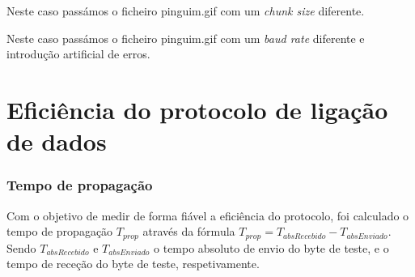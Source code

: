 \documentclass[11pt]{report}
\begin{document}
Neste caso passámos o ficheiro pinguim.gif com um \textit{chunk size} diferente.

Neste caso passámos o ficheiro pinguim.gif com um \textit{baud rate} diferente e
introdução artificial de erros.

{\let\clearpage\relax \chapter{Eficiência do protocolo de ligação de dados}}

\subsection{Tempo de propagação}

Com o objetivo de medir de forma fiável a eficiência do protocolo, foi calculado
o tempo de propagação $T_{prop}$ através da fórmula
$T_{prop} = T_{absRecebido} - T_{absEnviado}$. Sendo $T_{absRecebido}$ e $T_{absEnviado}$ o tempo
absoluto de envio do byte de teste, e o tempo de receção do byte de teste,
respetivamente.
\end{document}
